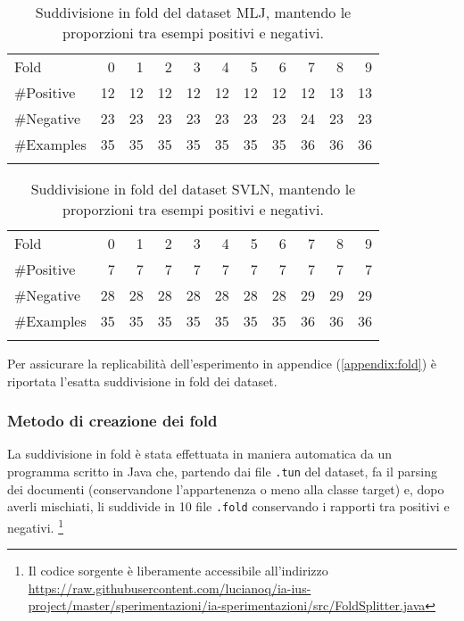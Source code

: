 \begin{table}[H]
	\centering
		\begin{tabular}{l@{\qquad}*{10}{r}}
		\toprule
\addlinespace
			Fold &  0 &  1 &  2 &  3 &  4 &  5 &  6 &  7 &  8 &  9 \\
\addlinespace
\midrule
\addlinespace
\#Positive  & 12  & 12  &  12 &  12 &  12 &  12 &  12 &  12 & 13 & 13 \\
\#Negative  & 23 & 23 & 23 & 23 & 23 & 23 & 23 & 24 & 23 & 23 \\
\#Examples  & 35 & 35 & 35 & 35 & 35 & 35 & 35 & 36 & 36 & 36 \\
\addlinespace
\bottomrule
		\end{tabular}
\caption[MLJ: suddivisione in fold.]{Suddivisione in fold del dataset MLJ, mantendo le proporzioni tra esempi positivi e negativi.}
	\label{tab:MLJ}
\end{table}

\begin{table}[H]
	\centering
		\begin{tabular}{l@{\qquad}*{10}{r}}
		\toprule
\addlinespace
			Fold &  0 &  1 &  2 &  3 &  4 &  5 &  6 &  7 &  8 &  9 \\
\addlinespace
\midrule
\addlinespace
\#Positive & 7  & 7  &  7 &  7 &  7 &  7 &  7 &  7 &  7 &  7 \\
\#Negative & 28 & 28 & 28 & 28 & 28 & 28 & 28 & 29 & 29 & 29 \\
\#Examples & 35 & 35 & 35 & 35 & 35 & 35 & 35 & 36 & 36 & 36 \\
\addlinespace
\bottomrule
		\end{tabular}
\caption[SVLN: suddivisione in fold.]{Suddivisione in fold del dataset SVLN, mantendo le proporzioni tra esempi positivi e negativi.}
	\label{tab:SVLN}
\end{table}

Per assicurare la replicabilità dell'esperimento in appendice (\ref{appendix:fold}) è riportata l'esatta suddivisione in fold dei dataset.

\subsubsection{Metodo di creazione dei fold}
La suddivisione in fold è stata effettuata in maniera automatica da un programma scritto in Java che, partendo dai file \verb+.tun+ del dataset, fa il parsing dei documenti (conservandone l'appartenenza o meno alla classe target) e, dopo averli mischiati, li suddivide in 10 file \verb+.fold+ conservando i rapporti tra positivi e negativi. \footnote{Il codice sorgente è liberamente accessibile all'indirizzo \url{https://raw.githubusercontent.com/lucianoq/ia-ius-project/master/sperimentazioni/ia-sperimentazioni/src/FoldSplitter.java}}